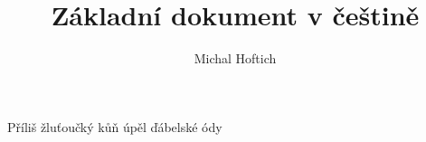\documentclass{article}
\title{Základní dokument v češtině}
\author{Michal Hoftich}
\begin{document}
\maketitle

Příliš žluťoučký kůň úpěl ďábelské ódy
\end{document}
